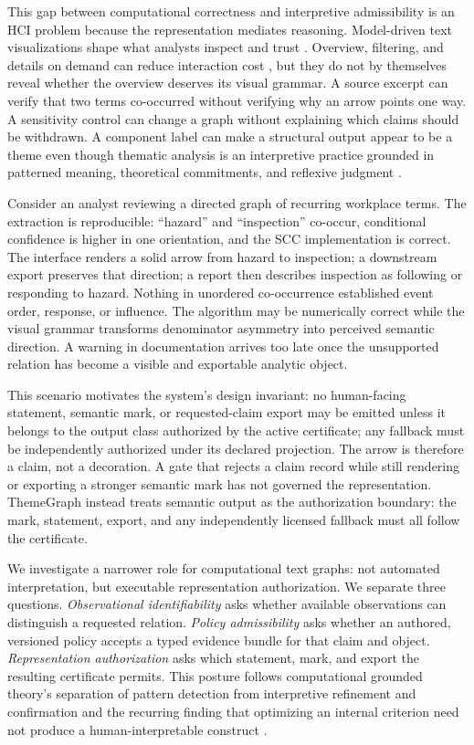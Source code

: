 \documentclass[manuscript,screen,review,anonymous]{acmart}
\begin{document}
This gap between computational correctness and interpretive admissibility is an HCI problem because the representation mediates reasoning. Model-driven text visualizations shape what analysts inspect and trust \cite{chuang2012}. Overview, filtering, and details on demand can reduce interaction cost \cite{shneiderman1996}, but they do not by themselves reveal whether the overview deserves its visual grammar. A source excerpt can verify that two terms co-occurred without verifying why an arrow points one way. A sensitivity control can change a graph without explaining which claims should be withdrawn. A component label can make a structural output appear to be a theme even though thematic analysis is an interpretive practice grounded in patterned meaning, theoretical commitments, and reflexive judgment \cite{braun2006,braun2021}.

Consider an analyst reviewing a directed graph of recurring workplace terms. The extraction is reproducible: ``hazard'' and ``inspection'' co-occur, conditional confidence is higher in one orientation, and the SCC implementation is correct. The interface renders a solid arrow from hazard to inspection; a downstream export preserves that direction; a report then describes inspection as following or responding to hazard. Nothing in unordered co-occurrence established event order, response, or influence. The algorithm may be numerically correct while the visual grammar transforms denominator asymmetry into perceived semantic direction. A warning in documentation arrives too late once the unsupported relation has become a visible and exportable analytic object.

This scenario motivates the system's design invariant: no human-facing statement, semantic mark, or requested-claim export may be emitted unless it belongs to the output class authorized by the active certificate; any fallback must be independently authorized under its declared projection. The arrow is therefore a claim, not a decoration. A gate that rejects a claim record while still rendering or exporting a stronger semantic mark has not governed the representation. ThemeGraph instead treats semantic output as the authorization boundary: the mark, statement, export, and any independently licensed fallback must all follow the certificate.

We investigate a narrower role for computational text graphs: not automated interpretation, but executable representation authorization. We separate three questions. \emph{Observational identifiability} asks whether available observations can distinguish a requested relation. \emph{Policy admissibility} asks whether an authored, versioned policy accepts a typed evidence bundle for that claim and object. \emph{Representation authorization} asks which statement, mark, and export the resulting certificate permits. This posture follows computational grounded theory's separation of pattern detection from interpretive refinement and confirmation \cite{nelson2020} and the recurring finding that optimizing an internal criterion need not produce a human-interpretable construct \cite{chang2009}.
\end{document}
